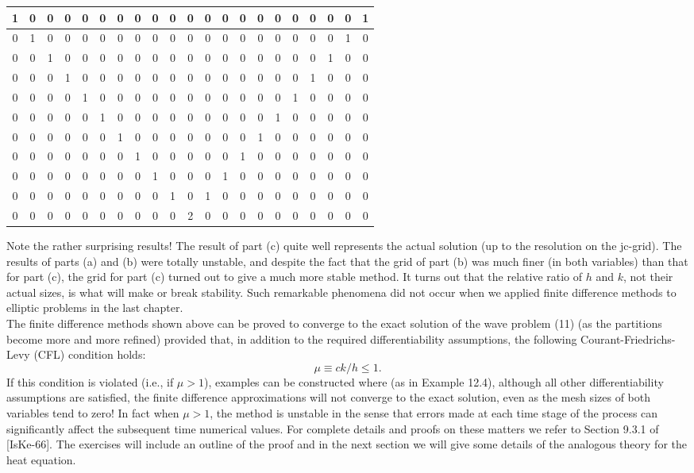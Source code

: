 \documentclass[../main.tex]{subfiles}
\begin{document}
\begin{table}[!ht]
    \centering
    \begin{tabular}{|c|c|c|c|c|c|c|c|c|c|c|c|c|c|c|c|c|c|c|c|c|}
    \hline
       1&0&0&0&0&0&0&0&0&0&0&0&0&0&0&0&0&0&0&0&1\\ \hline
       0&1&0&0&0&0&0&0&0&0&0&0&0&0&0&0&0&0&0&1&0\\ \hline
       0&0&1&0&0&0&0&0&0&0&0&0&0&0&0&0&0&0&1&0&0\\ \hline
       0&0&0&1&0&0&0&0&0&0&0&0&0&0&0&0&0&1&0&0&0\\ \hline
       0&0&0&0&1&0&0&0&0&0&0&0&0&0&0&0&1&0&0&0&0\\ \hline
       0&0&0&0&0&1&0&0&0&0&0&0&0&0&0&1&0&0&0&0&0\\ \hline
       0&0&0&0&0&0&1&0&0&0&0&0&0&0&1&0&0&0&0&0&0\\ \hline
       0&0&0&0&0&0&0&1&0&0&0&0&0&1&0&0&0&0&0&0&0\\ \hline
       0&0&0&0&0&0&0&0&1&0&0&0&1&0&0&0&0&0&0&0&0\\ \hline
       0&0&0&0&0&0&0&0&0&1&0&1&0&0&0&0&0&0&0&0&0\\ \hline
       0&0&0&0&0&0&0&0&0&0&2&0&0&0&0&0&0&0&0&0&0\\ \hline
    \end{tabular}
\end{table}
Note the rather surprising results! The result of part (c) quite well represents the actual solution (up to the resolution on the jc-grid). The results of parts (a) and (b) were totally unstable, and despite the fact that the grid of part (b) was much finer (in both variables) than that for part (c), the grid for part (c) turned out to give a much more stable method. It turns out that the relative ratio of $h$ and $k$, not their actual sizes, is what will make or break stability. Such remarkable phenomena did not occur when we applied finite difference methods to elliptic problems in the last chapter. 
\\

The finite difference methods shown above can be proved to converge to the 
exact solution of the wave problem (11) (as the partitions become more and more 
refined) provided that, in addition to the required differentiability assumptions, 
the following Courant-Friedrichs-Levy (CFL) condition holds: 
\begin{equation} \label{eqa31}
	\mu \equiv ck/h\leqslant1.
\end{equation}
If this condition is violated (i.e., if $\mu > 1$), examples can be constructed where (as in Example 12.4), although all other differentiability assumptions are satisfied, the finite difference approximations will not converge to the exact solution, even as the mesh sizes of both variables tend to zero! In fact when $\mu > 1$, the method is unstable in the sense that errors made at each time stage of the process can significantly affect the subsequent time numerical values. For complete details and proofs on these matters we refer to Section 9.3.1 of [IsKe-66]. The exercises will include an outline of the proof and in the next section we will give some 
details of the analogous theory for the heat equation.
\\
\end{document}
